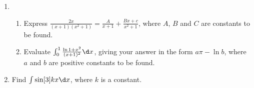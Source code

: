 \begin{problem}
    \begin{enumerate}
        \item \begin{enumerate}
            \item Express $\frac{2x}{(x+1)(x^2 + 1)} = \frac{A}{x+1} + \frac{Bx + c}{x^2 + 1}$, where $A$, $B$ and $C$ are constants to be found.
            \item Evaluate $\int_0^1 \frac{\ln{1+x^2}}{(x+1)^2} \d x$, giving your answer in the form $a\pi - \ln b$, where $a$ and $b$ are positive constants to be found.
        \end{enumerate}
        \item Find $\int \sin[3]{kx} \d x$, where $k$ is a constant.
    \end{enumerate}
\end{problem}
